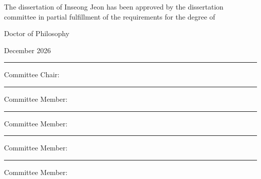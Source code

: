 \documentclass[11pt,oneside]{report}
\theoremstyle{plain}
\theoremstyle{definition}
\theoremstyle{remark}
\begin{document}
\newpage
\begin{center}
\vspace{1cm}
{\fontsize{16pt}{18pt}\selectfont
The dissertation of Inseong Jeon has been approved by the dissertation committee
in partial fulfillment of the requirements for the degree of \par
Doctor of Philosophy \par}
\vspace{1cm}
{\fontsize{14pt}{14pt}\selectfont December 2026 \par}   %
\vspace{2cm}
\rule{.6\textwidth}{0.4pt}\par
{\fontsize{16pt}{16pt}\selectfont Committee Chair: \hspace{2em} \par}
\vspace{1cm}
\rule{.6\textwidth}{0.4pt}\par
{\fontsize{16pt}{16pt}\selectfont Committee Member: \hspace{2em} \par}
\vspace{1cm}
\rule{.6\textwidth}{0.4pt}\par
{\fontsize{16pt}{16pt}\selectfont Committee Member: \hspace{2em} \par}
\vspace{1cm}
\rule{.6\textwidth}{0.4pt}\par
{\fontsize{16pt}{16pt}\selectfont Committee Member: \hspace{2em} \par}
\vspace{1cm}
\rule{.6\textwidth}{0.4pt}\par
{\fontsize{16pt}{16pt}\selectfont Committee Member: \hspace{2em} \par}
\vspace{1cm}
\end{center}

\newpage
{}
\hypersetup{pageanchor=true}   %
\end{document}
